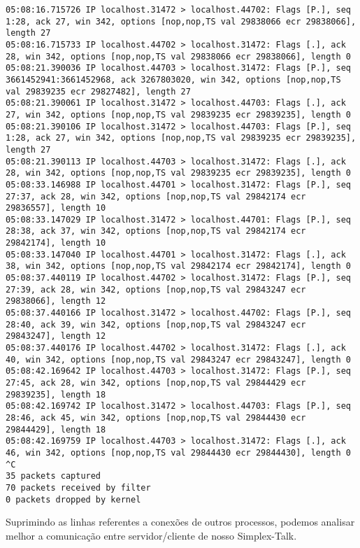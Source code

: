 \documentclass[a4paper,10pt]{article}
\begin{document}
\begin{lstlisting}
05:08:16.715726 IP localhost.31472 > localhost.44702: Flags [P.], seq 1:28, ack 27, win 342, options [nop,nop,TS val 29838066 ecr 29838066], length 27
05:08:16.715733 IP localhost.44702 > localhost.31472: Flags [.], ack 28, win 342, options [nop,nop,TS val 29838066 ecr 29838066], length 0
05:08:21.390036 IP localhost.44703 > localhost.31472: Flags [P.], seq 3661452941:3661452968, ack 3267803020, win 342, options [nop,nop,TS val 29839235 ecr 29827482], length 27
05:08:21.390061 IP localhost.31472 > localhost.44703: Flags [.], ack 27, win 342, options [nop,nop,TS val 29839235 ecr 29839235], length 0
05:08:21.390106 IP localhost.31472 > localhost.44703: Flags [P.], seq 1:28, ack 27, win 342, options [nop,nop,TS val 29839235 ecr 29839235], length 27
05:08:21.390113 IP localhost.44703 > localhost.31472: Flags [.], ack 28, win 342, options [nop,nop,TS val 29839235 ecr 29839235], length 0
05:08:33.146988 IP localhost.44701 > localhost.31472: Flags [P.], seq 27:37, ack 28, win 342, options [nop,nop,TS val 29842174 ecr 29836557], length 10
05:08:33.147029 IP localhost.31472 > localhost.44701: Flags [P.], seq 28:38, ack 37, win 342, options [nop,nop,TS val 29842174 ecr 29842174], length 10
05:08:33.147040 IP localhost.44701 > localhost.31472: Flags [.], ack 38, win 342, options [nop,nop,TS val 29842174 ecr 29842174], length 0
05:08:37.440119 IP localhost.44702 > localhost.31472: Flags [P.], seq 27:39, ack 28, win 342, options [nop,nop,TS val 29843247 ecr 29838066], length 12
05:08:37.440166 IP localhost.31472 > localhost.44702: Flags [P.], seq 28:40, ack 39, win 342, options [nop,nop,TS val 29843247 ecr 29843247], length 12
05:08:37.440176 IP localhost.44702 > localhost.31472: Flags [.], ack 40, win 342, options [nop,nop,TS val 29843247 ecr 29843247], length 0
05:08:42.169642 IP localhost.44703 > localhost.31472: Flags [P.], seq 27:45, ack 28, win 342, options [nop,nop,TS val 29844429 ecr 29839235], length 18
05:08:42.169742 IP localhost.31472 > localhost.44703: Flags [P.], seq 28:46, ack 45, win 342, options [nop,nop,TS val 29844430 ecr 29844429], length 18
05:08:42.169759 IP localhost.44703 > localhost.31472: Flags [.], ack 46, win 342, options [nop,nop,TS val 29844430 ecr 29844430], length 0
^C
35 packets captured
70 packets received by filter
0 packets dropped by kernel

\end{lstlisting}

Suprimindo as linhas referentes a conexões de outros processos, podemos analisar melhor a comunicação entre servidor/cliente de nosso Simplex-Talk.
\end{document}
